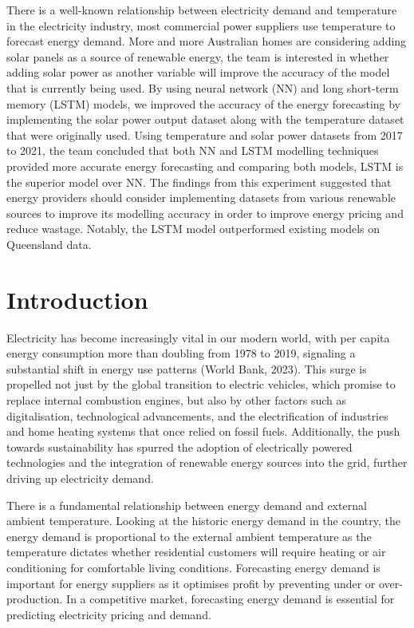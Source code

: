 \documentclass[mstat,12pt]{unswthesis}
\begin{document}
There is a well-known relationship between electricity demand and
temperature in the electricity industry, most commercial power suppliers
use temperature to forecast energy demand. More and more Australian
homes are considering adding solar panels as a source of renewable
energy, the team is interested in whether adding solar power as another
variable will improve the accuracy of the model that is currently being
used. By using neural network (NN) and long short-term memory (LSTM)
models, we improved the accuracy of the energy forecasting by
implementing the solar power output dataset along with the temperature
dataset that were originally used. Using temperature and solar power
datasets from 2017 to 2021, the team concluded that both NN and LSTM
modelling techniques provided more accurate energy forecasting and
comparing both models, LSTM is the superior model over NN. The findings
from this experiment suggested that energy providers should consider
implementing datasets from various renewable sources to improve its
modelling accuracy in order to improve energy pricing and reduce
wastage. Notably, the LSTM model outperformed existing models on
Queensland data.

\section{Introduction}\label{introduction}

Electricity has become increasingly vital in our modern world, with per
capita energy consumption more than doubling from 1978 to 2019,
signaling a substantial shift in energy use patterns (World Bank, 2023).
This surge is propelled not just by the global transition to electric
vehicles, which promise to replace internal combustion engines, but also
by other factors such as digitalisation, technological advancements, and
the electrification of industries and home heating systems that once
relied on fossil fuels. Additionally, the push towards sustainability
has spurred the adoption of electrically powered technologies and the
integration of renewable energy sources into the grid, further driving
up electricity demand.

There is a fundamental relationship between energy demand and external
ambient temperature. Looking at the historic energy demand in the
country, the energy demand is proportional to the external ambient
temperature as the temperature dictates whether residential customers
will require heating or air conditioning for comfortable living
conditions. Forecasting energy demand is important for energy suppliers
as it optimises profit by preventing under or over-production. In a
competitive market, forecasting energy demand is essential for
predicting electricity pricing and demand.
\end{document}
